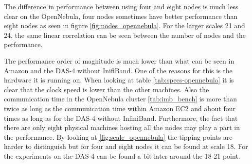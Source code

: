 The difference in performance between using four and eight nodes is much less clear on the OpenNebula, four nodes sometimes have better performance than eight nodes as seen in figure \ref{fig:nodes_opennebula}.
For the larger scales 21 and 24, the same linear correlation can be seen between the number of nodes and the performance.

The performance order of magnitude is much lower than what can be seen in Amazon and the DAS-4 without InifiBand. One of the reasons for this is the hardware it is running on. When looking at table \ref{tab:specs-opennebula} it is clear that the clock speed is lower than the other machines. Also the communication time in the OpenNebula cluster \ref{tab:imb_bench} is more than twice as long as the communication time within Amazon EC2 and about four times as long as for the DAS-4 without InfiniBand. Furthermore, the fact that there are only eight physical machines hosting all the nodes may play a part in the performance. By looking at \ref{fig:scale_opennebula} the tipping points are harder to distinguish but for four and eight nodes it can be found at scale 18. For the experiments on the DAS-4 can be found a bit later around the 18-21 point.


